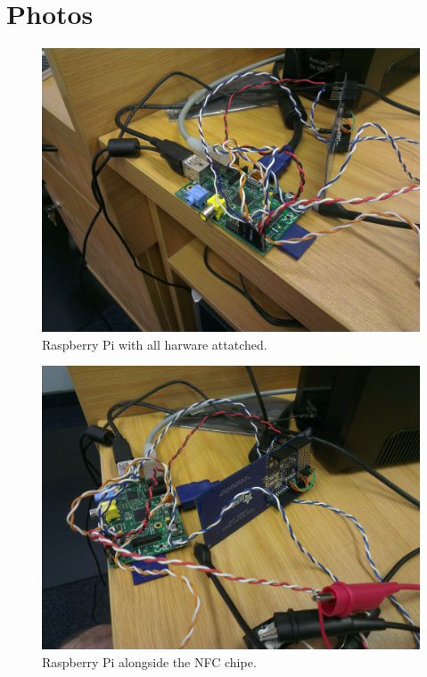 \chapter{Photos}

\begin{figure}
 \centering 
 \includegraphics[clip=true, trim = 1000 500 800 500,
 scale=0.18]{pi}
 \caption{Raspberry Pi with all harware attatched.}
\end{figure}

\begin{figure}
 \centering 
 \includegraphics[clip=true, trim = 0 500 600 0,
 scale=0.15]{pi_and_nfc}
 \caption{Raspberry  Pi alongside the NFC chipe.}
\end{figure}

